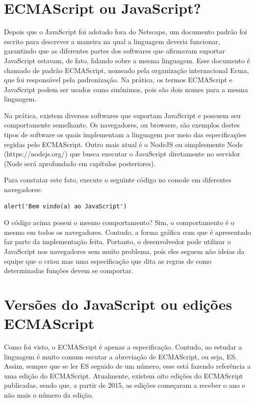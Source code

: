 \section{ECMAScript ou JavaScript?}

Depois que o JavaScript foi adotado fora do Netscape, um documento padrão foi escrito para descrever a maneira na qual a linguagem deveria funcionar, garantindo que as diferentes partes dos softwares que afirmavam suportar JavaScript estavam, de fato, falando sobre a mesma linguagem. Esse documento é chamado de padrão ECMAScript, nomeado pela organização internacional Ecma, que foi responsável pela padronização. Na prática, os termos ECMAScript e JavaScript podem ser usados como sinônimos, pois são dois nomes para a mesma linguagem.

Na prática, existem diversos softwares que suportam JavaScript e possuem seu comportamente semelhante. Os navegadores, ou browsers, são exemplos destes tipos de software os quais implementam a linguagem por meio das especificações regidas pelo ECMAScript. Outro mais atual é o NodeJS ou simplesmente Node (https://nodejs.org/) que busca executar o JavaScript diretamente no servidor (Node será aprofundado em capítulos posteriores).

Para constatar este fato, execute o seguinte código no console em diferentes navegadores: 

\begin{lstlisting}
alert('Bem vindo(a) ao JavaScript')
\end{lstlisting}


O código acima possui o mesmo comportamento? Sim, o comportamento é o mesmo em todos os navegadores. Contudo, a forma gráfica com que é apresentado faz parte da implementação feita. Portanto, o desenvolvedor pode utilizar o JavaScript nos navegadores sem muito problema, pois eles seguem não ideias da equipe que o criou mas uma especificação que dita as regras de como determinadas funções devem se comportar.

\section{Versões do JavaScript ou edições ECMAScript}

Como foi visto, o ECMAScript é apenas a especificação. Contudo, ao estudar a linguagem é muito comum escutar a abreviação de ECMAScript, ou seja, ES. Assim, sempre que se ler ES seguido de um número, esse está fazendo referência a uma edição do ECMAScript. Atualmente, existem oito edições do ECMAScript publicadas, sendo que, a partir de 2015, as edições começaram a receber o ano e não mais o número da edição.


